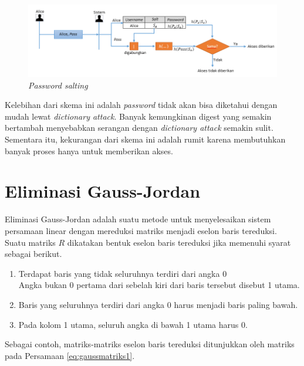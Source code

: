 \begin{figure}[H]
	\includegraphics[scale=0.7]{Gambar/password_3}
	\centering
	\caption{\textit{Password salting}}\label{fig:password3}
\end{figure}

Kelebihan dari skema ini adalah \textit{password} tidak akan bisa diketahui dengan mudah lewat \textit{dictionary attack}. Banyak kemungkinan digest yang semakin bertambah menyebabkan serangan dengan \textit{dictionary attack} semakin sulit. Sementara itu, kekurangan dari skema ini adalah rumit karena membutuhkan banyak proses hanya untuk memberikan akses.

\section{Eliminasi Gauss-Jordan}\label{sec:eliminasigaussjordan}

Eliminasi Gauss-Jordan adalah suatu metode untuk menyelesaikan sistem persamaan linear dengan mereduksi matriks menjadi eselon baris tereduksi\cite{norman2012introduction}. Suatu matriks \begin{math}R\end{math} dikatakan bentuk eselon baris tereduksi jika memenuhi syarat sebagai berikut\cite{norman2012introduction}.

\begin{enumerate}
	\item Terdapat baris yang tidak seluruhnya terdiri dari angka 0 \\
	Angka bukan 0 pertama dari sebelah kiri dari baris tersebut disebut 1 utama.
	\item Baris yang seluruhnya terdiri dari angka 0 harus menjadi baris paling bawah.
	\item Pada kolom 1 utama, seluruh angka di bawah 1 utama harus 0.
\end{enumerate}

Sebagai contoh, matriks-matriks eselon baris tereduksi ditunjukkan oleh matriks pada Persamaan \ref{eq:gaussmatriks1}.

